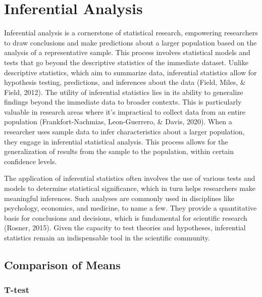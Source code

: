 \documentclass[
]{book}
\begin{document}
\hypertarget{inferential-analysis}{%
\section{Inferential Analysis}\label{inferential-analysis}}

Inferential analysis is a cornerstone of statistical research, empowering researchers to draw conclusions and make predictions about a larger population based on the analysis of a representative sample. This process involves statistical models and tests that go beyond the descriptive statistics of the immediate dataset. Unlike descriptive statistics, which aim to summarize data, inferential statistics allow for hypothesis testing, predictions, and inferences about the data (Field, Miles, \& Field, 2012). The utility of inferential statistics lies in its ability to generalize findings beyond the immediate data to broader contexts. This is particularly valuable in research areas where it's impractical to collect data from an entire population (Frankfort-Nachmias, Leon-Guerrero, \& Davis, 2020). When a researcher uses sample data to infer characteristics about a larger population, they engage in inferential statistical analysis. This process allows for the generalization of results from the sample to the population, within certain confidence levels.

The application of inferential statistics often involves the use of various tests and models to determine statistical significance, which in turn helps researchers make meaningful inferences. Such analyses are commonly used in disciplines like psychology, economics, and medicine, to name a few. They provide a quantitative basis for conclusions and decisions, which is fundamental for scientific research (Rosner, 2015). Given the capacity to test theories and hypotheses, inferential statistics remain an indispensable tool in the scientific community.

\hypertarget{comparison-of-means}{%
\subsection*{Comparison of Means}\label{comparison-of-means}}

\hypertarget{t-test}{%
\subsubsection*{T-test}\label{t-test}}
\end{document}
